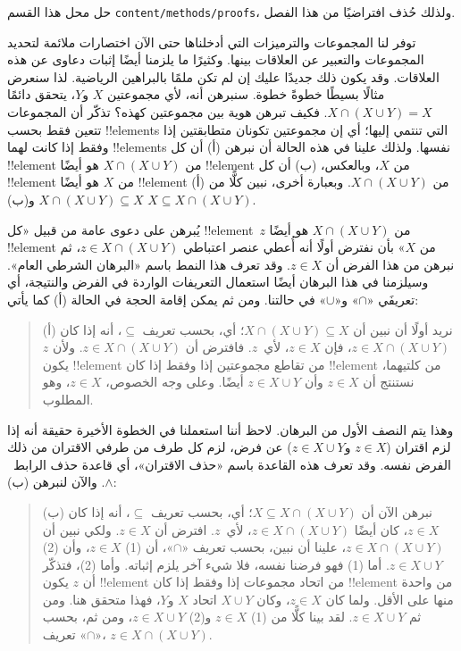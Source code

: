 \documentclass[../../../include/open-logic-section]{subfiles}
\begin{document}

\begin{editorial}
حل محل هذا القسم \verb|content/methods/proofs|، ولذلك حُذف افتراضيًا
من هذا الفصل.
\end{editorial}

\begin{explain}
توفر لنا المجموعات والترميزات التي أدخلناها حتى الآن اختصارات ملائمة
لتحديد المجموعات والتعبير عن العلاقات بينها. وكثيرًا ما يلزمنا أيضًا
إثبات دعاوى عن هذه العلاقات. وقد يكون ذلك جديدًا عليك إن لم تكن ملمًا
بالبراهين الرياضية. لذا سنعرض مثالًا بسيطًا خطوةً خطوة. سنبرهن أنه، لأي
مجموعتين $X$ و$Y$، يتحقق دائمًا $X \cap (X \cup Y) = X$. فكيف تبرهن
هوية بين مجموعتين كهذه؟ تذكّر أن المجموعات تتعين فقط بحسب !!{element}s
التي تنتمي إليها؛ أي إن مجموعتين تكونان متطابقتين إذا وفقط إذا كانت
لهما !!{element}s نفسها. ولذلك علينا في هذه الحالة أن نبرهن (أ) أن كل
!!{element} من $X \cap (X \cup Y)$ هو أيضًا !!{element} من $X$،
وبالعكس، (ب) أن كل !!{element} من $X$ هو أيضًا !!{element} من
$X \cap (X \cup Y)$. وبعبارة أخرى، نبين كلًّا من (أ)
$X \cap (X \cup Y) \subseteq X$ و(ب) $X \subseteq X \cap (X \cup Y)$.

يُبرهن على دعوى عامة من قبيل «كل !!{element}~$z$ من $X \cap (X
\cup Y)$ هو أيضًا !!{element} من $X$» بأن نفترض أولًا أنه أُعطي
عنصر اعتباطي $z \in X \cap (X \cup Y)$، ثم نبرهن من هذا الفرض أن
$z \in X$. وقد تعرف هذا النمط باسم «البرهان الشرطي العام». وسيلزمنا
في هذا البرهان أيضًا استعمال التعريفات الواردة في الفرض والنتيجة،
أي تعريفَي «$\cap$» و«$\cup$» في حالتنا. ومن ثم يمكن إقامة الحجة في
الحالة (أ) كما يأتي:

\begin{quote}
(أ) نريد أولًا أن نبين أن $X \cap (X \cup Y) \subseteq X$؛ أي، بحسب
تعريف $\subseteq$، أنه إذا كان $z \in X \cap (X \cup Y)$، فإن
$z \in X$، لأي~$z$. فافترض أن $z \in X \cap (X \cup Y)$. ولأن
$z$ يكون !!{element} من تقاطع مجموعتين إذا وفقط إذا كان !!{element}
من كلتيهما، نستنتج أن $z \in X$ وأن $z \in X \cup Y$ أيضًا. وعلى
وجه الخصوص، $z \in X$، وهو المطلوب.
\end{quote}

وهذا يتم النصف الأول من البرهان. لاحظ أننا استعملنا في الخطوة الأخيرة
حقيقة أنه إذا لزم اقتران ($z \in X$ و$z \in X \cup Y$) عن فرض، لزم
كل طرف من طرفي الاقتران من ذلك الفرض نفسه. وقد تعرف هذه القاعدة باسم
«حذف الاقتران»، أي قاعدة حذف الرابط~$\land$. والآن لنبرهن (ب):

\begin{quote}
(ب) نبرهن الآن أن $X \subseteq X \cap (X \cup Y)$؛ أي، بحسب تعريف
$\subseteq$، أنه إذا كان $z \in X$، كان أيضًا $z \in X \cap
(X \cup Y)$، لأي~$z$. افترض أن $z \in X$. ولكي نبين أن $z \in X
\cap (X \cup Y)$، علينا أن نبين، بحسب تعريف «$\cap$»، أن (1)
$z \in X$، وأن (2) $z \in X \cup Y$. أما (1) فهو فرضنا نفسه، فلا
شيء آخر يلزم إثباته. وأما (2)، فتذكّر أن $z$ يكون !!{element} من اتحاد
مجموعات إذا وفقط إذا كان !!{element} من واحدة منها على الأقل. ولما كان
$z \in X$، وكان $X \cup Y$ اتحاد $X$ و$Y$، فهذا متحقق هنا. ومن ثم
$z \in X \cup Y$. لقد بينا كلًّا من (1) $z \in X$ و(2)
$z \in X \cup Y$، ومن ثم، بحسب تعريف «$\cap$»،
$z \in X \cap (X \cup Y)$.
\end{quote}


\end{explain}
\end{document}
